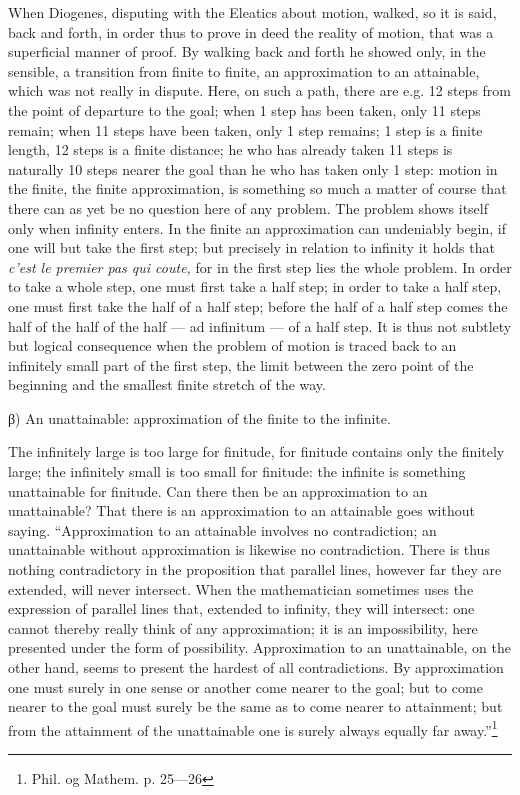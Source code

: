 \documentclass[12pt,a4paper,openany]{book}
\newcommand{\opage}[1]{\marginnote{\footnotesize\textit{[#1]}}}
\begin{document}
When Diogenes, disputing with the Eleatics
\setcounter{footnote}{0}%
\opage{35}about motion, walked, so it is said, back and forth, in order thus to prove in deed the reality of motion, that was a superficial manner of proof. By walking back and forth he showed only, in the sensible, a transition from finite to finite, an approximation to an attainable, which was not really in dispute. Here, on such a path, there are e.g. 12 steps from the point of departure to the goal; when 1 step has been taken, only 11 steps remain; when 11 steps have been taken, only 1 step remains; 1 step is a finite length, 12 steps is a finite distance; he who has already taken 11 steps is naturally 10 steps nearer the goal than he who has taken only 1 step: motion in the finite, the finite approximation, is something so much a matter of course that there can as yet be no question here of any problem. The problem shows itself only when infinity enters. In the finite an approximation can undeniably begin, if one will but take the first step; but precisely in relation to infinity it holds that \textit{c'est le premier pas qui coute,} for in the first step lies the whole problem. In order to take a whole step, one must first take a half step; in order to take a half step, one must first take the half of a half step; before the half of a half step comes the half of the half of the half --- ad infinitum --- of a half step. It is thus not subtlety but logical consequence when the problem of motion is traced back to an infinitely small part of the first step, the limit between the zero point of the beginning and the smallest finite stretch of the way.

\begin{center}β) An unattainable: approximation of the finite to the infinite.\end{center}

The infinitely large is too large for finitude, for finitude contains only the finitely large; the infinitely small is too small for finitude: the infinite is something unattainable for finitude. Can there then be an approximation to an unattainable? That there is an approximation to
\setcounter{footnote}{0}%
\opage{36}an attainable goes without saying. ``Approximation to an attainable involves no contradiction; an unattainable without approximation is likewise no contradiction. There is thus nothing contradictory in the proposition that parallel lines, however far they are extended, will never intersect. When the mathematician sometimes uses the expression of parallel lines that, extended to infinity, they will intersect: one cannot thereby really think of any approximation; it is an impossibility, here presented under the form of possibility. Approximation to an unattainable, on the other hand, seems to present the hardest of all contradictions. By approximation one must surely in one sense or another come nearer to the goal; but to come nearer to the goal must surely be the same as to come nearer to attainment; but from the attainment of the unattainable one is surely always equally far away.''\footnote[1]{Phil. og Mathem. p. 25—26}
\end{document}
